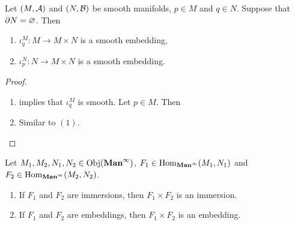 \documentclass{book}
\begin{document}
	\begin{ex} 
		Let $(M, \mathcal{A})$ and $(N, \mathcal{B})$ be smooth manifolds, $p \in M$ and $q \in N$. Suppose that $\partial N = \varnothing$. Then 
		\begin{enumerate}
			\item $\iota^M_q: M \rightarrow M \times N$ is a smooth embedding,
			\item $\iota^N_p: N \rightarrow M \times N$ is a smooth embedding.
		\end{enumerate}
	\end{ex}

	\begin{proof}\
		\begin{enumerate}
			\item {} implies that $\iota_q^M$ is smooth. Let $p \in M$. Then 
			\item Similar to $(1)$.
		\end{enumerate}
	\end{proof}

\begin{ex} 
	Let $M_1, M_2, N_1, N_2 \in \operatorname{Obj}(\operatorname*{\text{\textbf{Man}}^{\infty}})$, $F_1 \in \operatorname{Hom}_{\operatorname*{\text{\textbf{Man}}^{\infty}}}(M_1, N_1)$ and $F_2 \in \operatorname{Hom}_{\operatorname*{\text{\textbf{Man}}^{\infty}}}(M_2, N_2)$. 
	\begin{enumerate}
		\item If $F_1$ and $F_2$ are immersions, then $F_1 \times F_2$ is an immersion. 
		\item If $F_1$ and $F_2$ are embeddings, then $F_1 \times F_2$ is an embedding. 
	\end{enumerate}
\end{ex}
\end{document}
